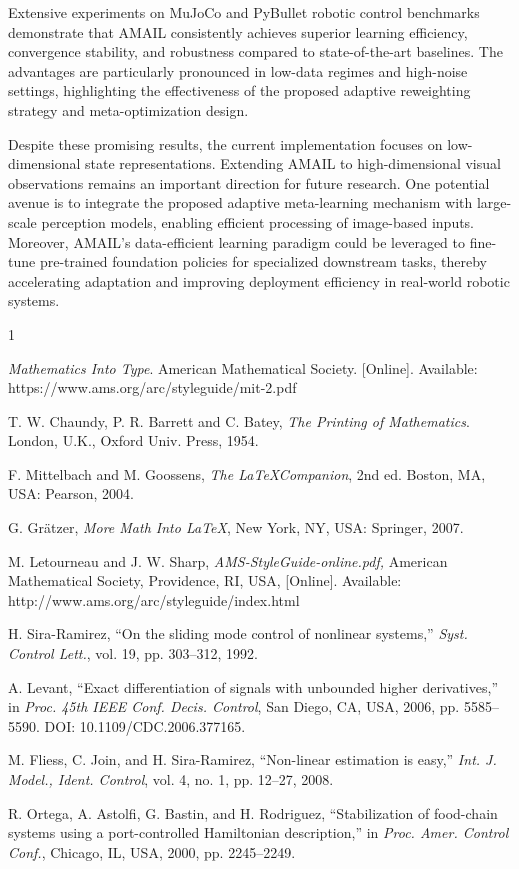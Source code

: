\documentclass[lettersize,journal]{IEEEtran}
\begin{document}
Extensive experiments on MuJoCo and PyBullet robotic control benchmarks demonstrate that AMAIL consistently achieves superior learning efficiency, convergence stability, and robustness compared to state-of-the-art baselines. The advantages are particularly pronounced in low-data regimes and high-noise settings, highlighting the effectiveness of the proposed adaptive reweighting strategy and meta-optimization design.

Despite these promising results, the current implementation focuses on low-dimensional state representations. Extending AMAIL to high-dimensional visual observations remains an important direction for future research. One potential avenue is to integrate the proposed adaptive meta-learning mechanism with large-scale perception models, enabling efficient processing of image-based inputs. Moreover, AMAIL's data-efficient learning paradigm could be leveraged to fine-tune pre-trained foundation policies for specialized downstream tasks, thereby accelerating adaptation and improving deployment efficiency in real-world robotic systems.

\begin{thebibliography}{1}


{\it{Mathematics Into Type}}. American Mathematical Society. [Online]. Available: https://www.ams.org/arc/styleguide/mit-2.pdf

T. W. Chaundy, P. R. Barrett and C. Batey, {\it{The Printing of Mathematics}}. London, U.K., Oxford Univ. Press, 1954.

F. Mittelbach and M. Goossens, {\it{The \LaTeX Companion}}, 2nd ed. Boston, MA, USA: Pearson, 2004.

G. Gr\"atzer, {\it{More Math Into LaTeX}}, New York, NY, USA: Springer, 2007.

M. Letourneau and J. W. Sharp, {\it{AMS-StyleGuide-online.pdf,}} American Mathematical Society, Providence, RI, USA, [Online]. Available: http://www.ams.org/arc/styleguide/index.html

H. Sira-Ramirez, ``On the sliding mode control of nonlinear systems,'' \textit{Syst. Control Lett.}, vol. 19, pp. 303--312, 1992.

A. Levant, ``Exact differentiation of signals with unbounded higher derivatives,''  in \textit{Proc. 45th IEEE Conf. Decis.
Control}, San Diego, CA, USA, 2006, pp. 5585--5590. DOI: 10.1109/CDC.2006.377165.

M. Fliess, C. Join, and H. Sira-Ramirez, ``Non-linear estimation is easy,'' \textit{Int. J. Model., Ident. Control}, vol. 4, no. 1, pp. 12--27, 2008.

R. Ortega, A. Astolfi, G. Bastin, and H. Rodriguez, ``Stabilization of food-chain systems using a port-controlled Hamiltonian description,'' in \textit{Proc. Amer. Control Conf.}, Chicago, IL, USA,
2000, pp. 2245--2249.

\end{thebibliography}
\end{document}
